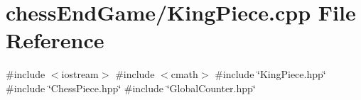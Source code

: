 \section{chess\+End\+Game/\+King\+Piece.cpp File Reference}
\label{_king_piece_8cpp}
{\ttfamily \#include $<$iostream$>$}\newline
{\ttfamily \#include $<$cmath$>$}\newline
{\ttfamily \#include \char`\"{}King\+Piece.\+hpp\char`\"{}}\newline
{\ttfamily \#include \char`\"{}Chess\+Piece.\+hpp\char`\"{}}\newline
{\ttfamily \#include \char`\"{}Global\+Counter.\+hpp\char`\"{}}\newline
